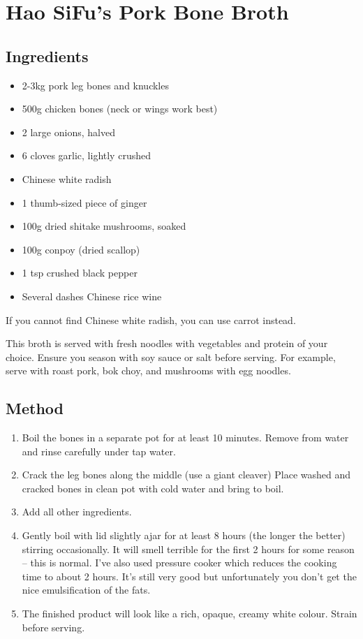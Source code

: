 \section{Hao SiFu's Pork Bone Broth}
  \begin{multicols}{2}
    \subsection{Ingredients}
      \begin{itemize}
        \item 2-3kg pork leg bones and knuckles
        \item 500g chicken bones (neck or wings work best)
        \item 2 large onions, halved
        \item 6 cloves garlic, lightly crushed
        \item {} Chinese white radish
        \item 1 thumb-sized piece of ginger
        \item 100g dried shitake mushrooms, soaked
        \item 100g conpoy (dried scallop)
        \item 1 tsp crushed black pepper
        \item Several dashes Chinese rice wine
      \end{itemize}
      If you cannot find Chinese white radish, you can use carrot instead.

      This broth is served with fresh noodles with vegetables and protein of your choice. Ensure you season with soy sauce or salt before serving. For example, serve with roast pork, bok choy, and mushrooms with egg noodles.
  \vfill\null
  \columnbreak
  \subsection{Method}
    \begin{enumerate}
      \item Boil the bones in a separate pot for at least 10 minutes. Remove from water and rinse carefully under tap water.
      \item Crack the leg bones along the middle (use a giant cleaver) Place washed and cracked bones in clean pot with cold water and bring to boil.
      \item Add all other ingredients.
      \item Gently boil with lid slightly ajar for at least 8 hours (the longer the better) stirring occasionally. It will smell terrible for the first 2 hours for some reason – this is normal. I've also used pressure cooker which reduces the cooking time to about 2 hours. It's still very good but unfortunately you don't get the nice emulsification of the fats.
      \item The finished product will look like a rich, opaque, creamy white colour. Strain before serving.
    \end{enumerate}
  \end{multicols}
